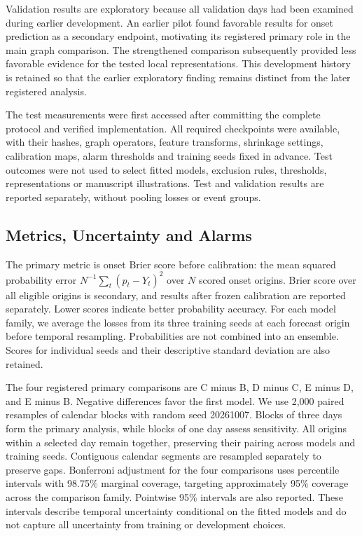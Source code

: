 \documentclass{llncs}
\begin{document}
Validation results are exploratory because all validation days had been examined during earlier development. An earlier pilot found favorable results for onset prediction as a secondary endpoint, motivating its registered primary role in the main graph comparison. The strengthened comparison subsequently provided less favorable evidence for the tested local representations. This development history is retained so that the earlier exploratory finding remains distinct from the later registered analysis.

The test measurements were first accessed after committing the complete protocol and verified implementation. All required checkpoints were available, with their hashes, graph operators, feature transforms, shrinkage settings, calibration maps, alarm thresholds and training seeds fixed in advance. Test outcomes were not used to select fitted models, exclusion rules, thresholds, representations or manuscript illustrations. Test and validation results are reported separately, without pooling losses or event groups.






\subsection{Metrics, Uncertainty and Alarms}
The primary metric is onset Brier score before calibration: the mean squared probability error $N^{-1}\sum_t(p_t-Y_t)^2$ over $N$ scored onset origins. Brier score over all eligible origins is secondary, and results after frozen calibration are reported separately. Lower scores indicate better probability accuracy. For each model family, we average the losses from its three training seeds at each forecast origin before temporal resampling. Probabilities are not combined into an ensemble. Scores for individual seeds and their descriptive standard deviation are also retained.

The four registered primary comparisons are C minus B, D minus C, E minus D, and E minus B. Negative differences favor the first model. We use 2,000 paired resamples of calendar blocks with random seed 20261007. Blocks of three days form the primary analysis, while blocks of one day assess sensitivity. All origins within a selected day remain together, preserving their pairing across models and training seeds. Contiguous calendar segments are resampled separately to preserve gaps. Bonferroni adjustment for the four comparisons uses percentile intervals with 98.75\% marginal coverage, targeting approximately 95\% coverage across the comparison family. Pointwise 95\% intervals are also reported. These intervals describe temporal uncertainty conditional on the fitted models and do not capture all uncertainty from training or development choices.
\end{document}
